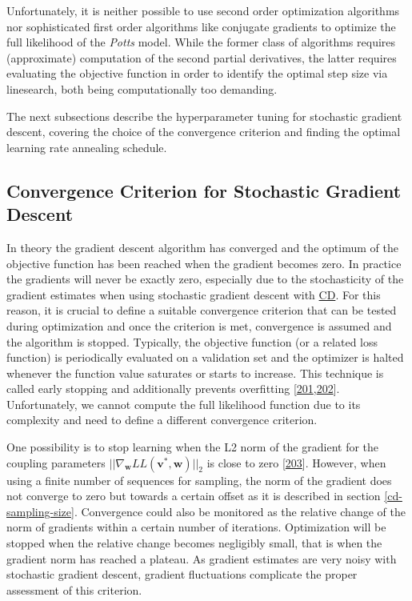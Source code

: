 \documentclass[11pt,a4paper,twoside]{book}
\renewcommand{\v}{\mathbf{v}}
\newcommand{\w}{\mathbf{w}}
\theoremstyle{definition}
\theoremstyle{definition}
\theoremstyle{remark}
\begin{document}
Unfortunately, it is neither possible to use second order optimization
algorithms nor sophisticated first order algorithms like conjugate
gradients to optimize the full likelihood of the \emph{Potts} model.
While the former class of algorithms requires (approximate) computation
of the second partial derivatives, the latter requires evaluating the
objective function in order to identify the optimal step size via
linesearch, both being computationally too demanding.

The next subsections describe the hyperparameter tuning for stochastic
gradient descent, covering the choice of the convergence criterion and
finding the optimal learning rate annealing schedule.

\subsection{Convergence Criterion for Stochastic Gradient
Descent}\label{convergence-criteria-sgd}

In theory the gradient descent algorithm has converged and the optimum
of the objective function has been reached when the gradient becomes
zero. In practice the gradients will never be exactly zero, especially
due to the stochasticity of the gradient estimates when using stochastic
gradient descent with \protect\hyperlink{abbrev}{CD}. For this reason,
it is crucial to define a suitable convergence criterion that can be
tested during optimization and once the criterion is met, convergence is
assumed and the algorithm is stopped. Typically, the objective function
(or a related loss function) is periodically evaluated on a validation
set and the optimizer is halted whenever the function value saturates or
starts to increase. This technique is called early stopping and
additionally prevents overfitting
{[}\protect\hyperlink{ref-Bengio2012}{201},\protect\hyperlink{ref-Mahsereci2017}{202}{]}.
Unfortunately, we cannot compute the full likelihood function due to its
complexity and need to define a different convergence criterion.

One possibility is to stop learning when the L2 norm of the gradient for
the coupling parameters \(||\nabla_{\w} L\!L(\v^*, \w)||_2\) is close to
zero {[}\protect\hyperlink{ref-Carreira-Perpinan2005}{203}{]}. However,
when using a finite number of sequences for sampling, the norm of the
gradient does not converge to zero but towards a certain offset as it is
described in section \ref{cd-sampling-size}. Convergence could also be
monitored as the relative change of the norm of gradients within a
certain number of iterations. Optimization will be stopped when the
relative change becomes negligibly small, that is when the gradient norm
has reached a plateau. As gradient estimates are very noisy with
stochastic gradient descent, gradient fluctuations complicate the proper
assessment of this criterion.
\end{document}
